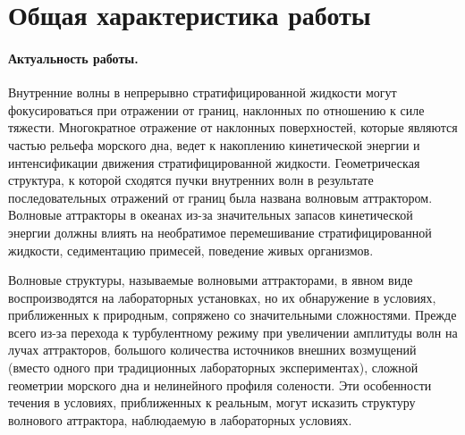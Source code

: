 \documentclass[utf8x]{G7-32} %
\begin{document}
\setcounter{page}{3}
\pagestyle{fancy}
\setcounter{secnumdepth}{-1}

\section{Общая характеристика работы}


\paragraph{Актуальность работы.}

Внутренние волны в непрерывно стратифицированной жидкости могут фокусироваться при отражении от границ, наклонных по отношению к силе тяжести. 
Многократное отражение от наклонных поверхностей, которые являются частью рельефа морского дна, ведет к накоплению кинетической энергии и интенсификации движения стратифицированной жидкости. 
Геометрическая структура, к которой сходятся пучки внутренних волн в результате последовательных отражений от границ была названа волновым аттрактором.
Волновые аттракторы в океанах из-за значительных запасов кинетической энергии должны влиять на необратимое перемешивание стратифицированной жидкости, седиментацию примесей, поведение живых организмов. 

Волновые структуры, называемые волновыми аттракторами, в явном виде воспроизводятся на лабораторных установках, но их обнаружение в условиях, приближенных к природным, сопряжено со значительными сложностями. Прежде всего из-за перехода к турбулентному режиму при увеличении амплитуды волн на лучах аттракторов, большого количества источников внешних возмущений (вместо одного при традиционных лабораторных экспериментах), сложной геометрии морского дна и нелинейного профиля солености. Эти особенности течения в условиях, приближенных к реальным, могут исказить структуру волнового аттрактора, наблюдаемую в лабораторных условиях. 
\end{document}
